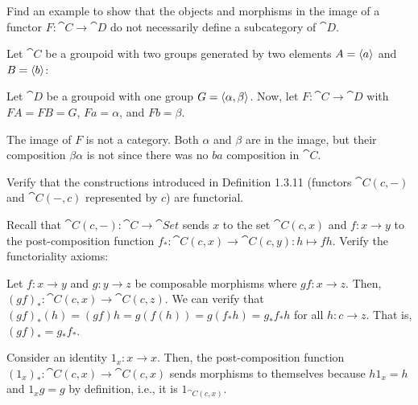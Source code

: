 \documentclass[notes,tikz]{agony}
\renewcommand{\C}{\cat{C}}
\newcommand{\D}{\cat{D}}
\begin{document}
\begin{xca}
  Find an example to show that the objects and morphisms in the image of a functor
  $F : \C \to \D$ do not necessarily define a subcategory of $\D$.
\end{xca}
\begin{sol}
  Let $\C$ be a groupoid with two groups
  generated by two elements $A = \ev{a}$ and $B = \ev{b}$:
  \begin{center}
  \end{center}
  Let $\D$ be a groupoid with one group $G = \ev{\alpha,\beta}$.
  Now, let $F : \C \to \D$ with $FA = FB = G$,
  $Fa = \alpha$, and $Fb = \beta$.

  The image of $F$ is not a category.
  Both $\alpha$ and $\beta$ are in the image, but their composition $\beta\alpha$ is not
  since there was no $ba$ composition in $\C$.
\end{sol}

\begin{xca}
  Verify that the constructions introduced in Definition 1.3.11
  (functors $\C(c,-)$ and $\C(-,c)$ represented by $c$) are functorial.
\end{xca}
\begin{prf}
  Recall that $\C(c,-) : \C \to \cat{Set}$
  sends $x$ to the set $\C(c,x)$
  and $f : x \to y$ to the post-composition function
  $f_* : \C(c,x) \to \C(c,y) : h \mapsto fh$.
  Verify the functoriality axioms:

  Let $f : x \to y$ and $g : y \to z$ be composable morphisms where $gf : x \to z$.
  Then, $(gf)_* : \C(c,x) \to \C(c,z)$.
  We can verify that $(gf)_*(h) = (gf)h = g(f(h)) = g(f_*h) = g_*f_*h$ for all $h : c \to z$.
  That is, $(gf)_* = g_*f_*$.

  Consider an identity $1_x : x \to x$.
  Then, the post-composition function $(1_x)_* : \C(c,x) \to \C(c,x)$
  sends morphisms to themselves because $h1_x = h$ and $1_xg = g$ by definition,
  i.e., it is $1_{\C(c,x)}$.
\end{prf}
\end{document}
